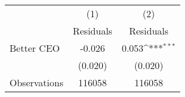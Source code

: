 {
\def\sym#1{\ifmmode^{#1}\else\(^{#1}\)\fi}
\begin{tabular}{l*{2}{c}}
\hline\hline
                    &\multicolumn{1}{c}{(1)}&\multicolumn{1}{c}{(2)}\\
                    &\multicolumn{1}{c}{Residuals}&\multicolumn{1}{c}{Residuals}\\
\hline
Better CEO          &      -0.026         &       0.053\sym{***}\\
                    &     (0.020)         &     (0.020)         \\
\hline
Observations        &      116058         &      116058         \\
\hline\hline
\end{tabular}
}
